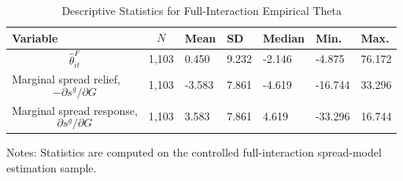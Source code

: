 \begin{table}[H]\centering
\begin{threeparttable}
\caption{Descriptive Statistics for Full-Interaction Empirical Theta}
\label{tab:theta_descriptive_stats}
\scriptsize
\begin{tabularx}{\textwidth}{lYYYYYY}
\toprule
Variable & $$N$$ & Mean & SD & Median & Min. & Max. \\
\midrule
$$\widehat{\theta}^{F}_{it}$$ & 1,103 & 0.450 & 9.232 & -2.146 & -4.875 & 76.172 \\
Marginal spread relief, $$-\partial s^g/\partial G$$ & 1,103 & -3.583 & 7.861 & -4.619 & -16.744 & 33.296 \\
Marginal spread response, $$\partial s^g/\partial G$$ & 1,103 & 3.583 & 7.861 & 4.619 & -33.296 & 16.744 \\
\bottomrule
\end{tabularx}
\begin{tablenotes}[flushleft]\footnotesize
\item Notes: Statistics are computed on the controlled full-interaction spread-model estimation sample.
\end{tablenotes}
\end{threeparttable}
\end{table}
